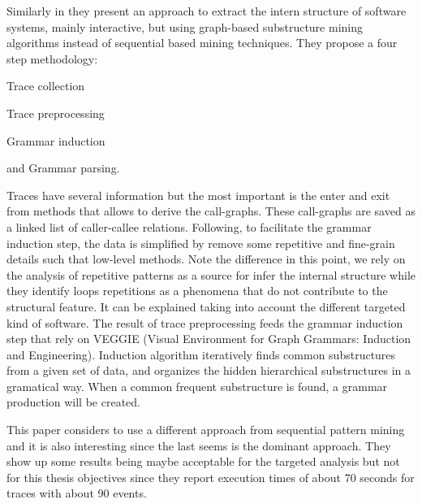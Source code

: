 Similarly in \cite{Zhao2008} they present an approach to extract the intern
structure of software systems, mainly interactive, but using graph-based 
substructure mining algorithms instead of sequential based mining techniques.
They propose a four step methodology: 
\begin{enumerate*}[label=\roman*)]
  \item Trace collection
  \item Trace preprocessing
  \item Grammar induction
  \item and Grammar parsing.
\end{enumerate*}
Traces have several information but the most important is the enter and exit
from methods that allows to derive the call-graphs. These call-graphs are saved
as a linked list of caller-callee relations. Following, to facilitate the
grammar induction step, the data is simplified by remove some repetitive and
fine-grain details such that low-level methods. Note
the difference in this point, we rely on the analysis of repetitive patterns as
a source for infer the internal structure while they identify loops repetitions
as a phenomena that do not contribute to the structural feature. It can be
explained taking into account the different targeted kind of software. The
result of trace preprocessing feeds the grammar induction step that rely on
VEGGIE (Visual Environment for Graph Grammars: Induction and Engineering). 
Induction algorithm iteratively finds common substructures from a
given set of data, and organizes the hidden hierarchical substructures in a
gramatical way. When a common frequent substructure is found, a grammar
production will be created.

This paper considers to use a different approach from sequential pattern mining
and it is also interesting since the last seems is the dominant approach. They show up
some results being maybe acceptable for the targeted analysis but not for this
thesis objectives since they report execution times of about 70 seconds for
traces with about 90 events.


